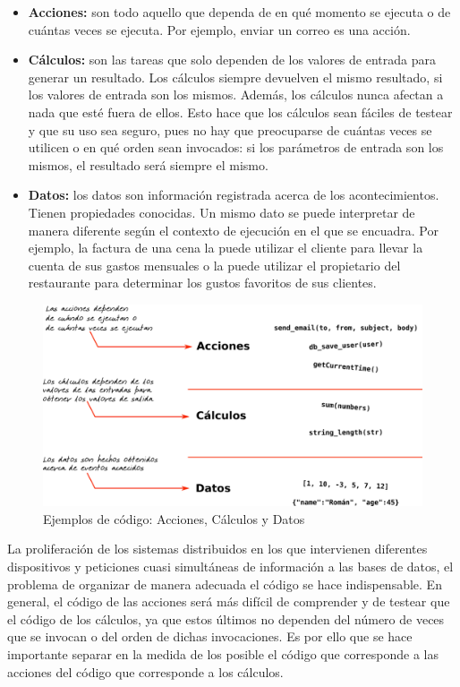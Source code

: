 \begin{itemize}
   \item \textbf{Acciones:} son todo aquello que dependa de en qué momento se ejecuta o de cuántas veces se ejecuta. Por ejemplo, enviar un correo es una acción.
   \item \textbf{Cálculos:} son las tareas que solo dependen de los valores de entrada para generar un resultado. Los cálculos siempre devuelven el mismo resultado, si los valores de entrada son los mismos. Además, los cálculos nunca afectan a nada que esté fuera de ellos. Esto hace que los cálculos sean fáciles de testear y que su uso sea seguro, pues no hay que preocuparse de cuántas veces se utilicen o en qué orden sean invocados: si los parámetros de entrada son los mismos, el resultado será siempre el mismo.
   \item \textbf{Datos:} los datos son información registrada acerca de los acontecimientos. Tienen propiedades conocidas. Un mismo dato se puede interpretar de manera diferente según el contexto de ejecución en el que se encuadra. Por ejemplo, la factura de una cena la puede utilizar el cliente para llevar la cuenta de sus gastos mensuales o la puede utilizar el propietario del restaurante para determinar los gustos favoritos de sus clientes.
\end{itemize}

\begin{figure}[htb]
   \centering
   \includegraphics[width=0.7\linewidth]{img/AccCalcData.png}
   \caption{Ejemplos de código: Acciones, Cálculos y Datos}
   \label{fig_acccalcdata}
\end{figure}


La proliferación de los sistemas distribuidos en los que intervienen diferentes dispositivos y peticiones cuasi simultáneas de información a las bases de datos, el problema de organizar de manera adecuada el código se hace indispensable. En general, el código de las acciones será más difícil de comprender y de testear que el código de los cálculos, ya que estos últimos no dependen del número de veces que se invocan o del orden de dichas invocaciones. Es por ello que se hace importante separar en la medida de los posible el código que corresponde a las acciones del código que corresponde a los cálculos.

